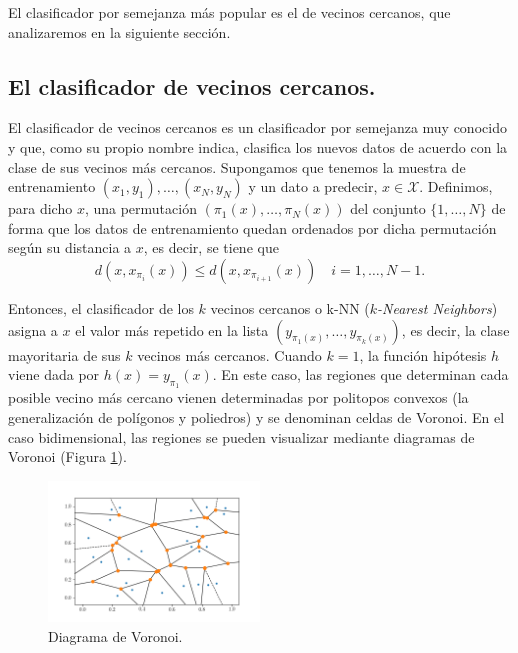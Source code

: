 El clasificador por semejanza más popular es el de vecinos cercanos, que analizaremos en la siguiente sección.

\subsection{El clasificador de vecinos cercanos.}

El clasificador de vecinos cercanos es un clasificador por semejanza muy conocido y que, como su propio nombre indica, clasifica los nuevos datos de acuerdo con la clase de sus vecinos más cercanos. Supongamos que tenemos la muestra de entrenamiento $(x_1,y_1),\dots,(x_N,y_N)$ y un dato a predecir, $x \in \mathcal{X}$. Definimos, para dicho $x$, una permutación $(\pi_1(x),\dots,\pi_N(x))$ del conjunto $\{1,\dots,N\}$ de forma que los datos de entrenamiento quedan ordenados por dicha permutación según su distancia a $x$, es decir, se tiene que
\[ d(x,x_{\pi_i}(x)) \le d(x,x_{\pi_{i+1}}(x)) \quad i=1,\dots,N-1. \]

Entonces, el clasificador de los $k$ vecinos cercanos o k-NN (\textit{$k$-Nearest Neighbors}) asigna a $x$ el valor más repetido en la lista $(y_{\pi_1(x)},\dots,y_{\pi_k(x)})$, es decir, la clase mayoritaria de sus $k$ vecinos más cercanos. Cuando $k=1$, la función hipótesis $h$ viene dada por $h(x) = y_{\pi_1}(x)$. En este caso, las regiones que determinan cada posible vecino más cercano vienen determinadas por politopos convexos (la generalización de polígonos y poliedros) y se denominan celdas de Voronoi. En el caso bidimensional, las regiones se pueden visualizar mediante diagramas de Voronoi (Figura \ref{fig:voronoi}).

\begin{figure}[h]
    \centering
    \includegraphics[width=0.5\textwidth]{./images/voronoi.png}
    \caption{Diagrama de Voronoi.} \label{fig:voronoi}
\end{figure}

